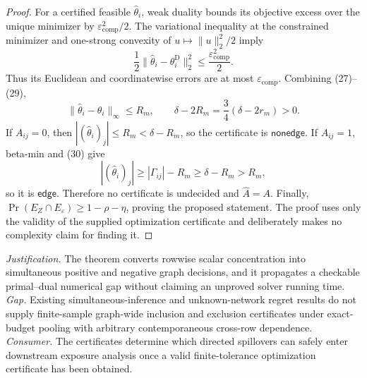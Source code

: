 \documentclass{article}
\begin{document}
\begin{proof}
For a certified feasible \(\widehat\theta_i\), weak duality bounds its objective excess over the unique minimizer by \(\varepsilon_{\mathrm{comp}}^2/2\).  The variational inequality at the constrained minimizer and one-strong convexity of \(u\mapsto\lVert u\rVert_2^2/2\) imply
\[
 \frac12\lVert\widehat\theta_i-\theta_i^{\mathrm D}\rVert_2^2
 \le\frac{\varepsilon_{\mathrm{comp}}^2}{2}.
 \tag{29}
\]
Thus its Euclidean and coordinatewise errors are at most \(\varepsilon_{\mathrm{comp}}\).  Combining (27)--(29),
\[
 \lVert\widehat\theta_i-\theta_i\rVert_\infty\le R_m,
 \qquad
 \delta-2R_m=\frac34(\delta-2r_m)>0.
 \tag{30}
\]
If \(A_{ij}=0\), then \(|(\widehat\theta_i)_j|\le R_m<\delta-R_m\), so the certificate is \(\mathsf{nonedge}\).  If \(A_{ij}=1\), beta-min and (30) give
\[
 |(\widehat\theta_i)_j|\ge|\Gamma_{ij}|-R_m
 \ge\delta-R_m>R_m,
\]
so it is \(\mathsf{edge}\).  Therefore no certificate is undecided and \(\widehat A=A\).  Finally, \(\Pr(E_Z\cap E_\varepsilon)\ge1-\rho-\eta\), proving the proposed statement.  The proof uses only the validity of the supplied optimization certificate and deliberately makes no complexity claim for finding it.
\end{proof}
\par\smallskip\noindent \textit{Justification.} The theorem converts rowwise scalar concentration into simultaneous positive and negative graph decisions, and it propagates a checkable primal--dual numerical gap without claiming an unproved solver running time. \textit{Gap.} Existing simultaneous-inference and unknown-network regret results do not supply finite-sample graph-wide inclusion and exclusion certificates under exact-budget pooling with arbitrary contemporaneous cross-row dependence. \textit{Consumer.} The certificates determine which directed spillovers can safely enter downstream exposure analysis once a valid finite-tolerance optimization certificate has been obtained.
\end{document}
